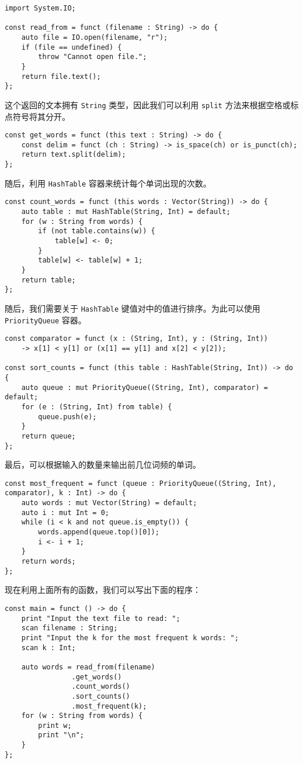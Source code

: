 \begin{lstlisting}
import System.IO;

const read_from = funct (filename : String) -> do {
    auto file = IO.open(filename, "r");
    if (file == undefined) {
        throw "Cannot open file.";
    }
    return file.text();
};
\end{lstlisting}

这个返回的文本拥有 \lstinline!String! 类型，因此我们可以利用 \lstinline!split! 方法来根据空格或标点符号将其分开。

\begin{lstlisting}
const get_words = funct (this text : String) -> do {
    const delim = funct (ch : String) -> is_space(ch) or is_punct(ch);
    return text.split(delim);
};
\end{lstlisting}

随后，利用 \lstinline!HashTable! 容器来统计每个单词出现的次数。

\begin{lstlisting}
const count_words = funct (this words : Vector(String)) -> do {
    auto table : mut HashTable(String, Int) = default;
    for (w : String from words) {
        if (not table.contains(w)) {
            table[w] <- 0;
        }
        table[w] <- table[w] + 1;
    }
    return table;
};
\end{lstlisting}

随后，我们需要关于 \lstinline!HashTable! 键值对中的值进行排序。为此可以使用 \lstinline!PriorityQueue! 容器。

\begin{lstlisting}
const comparator = funct (x : (String, Int), y : (String, Int)) 
    -> x[1] < y[1] or (x[1] == y[1] and x[2] < y[2]);

const sort_counts = funct (this table : HashTable(String, Int)) -> do {
    auto queue : mut PriorityQueue((String, Int), comparator) = default;
    for (e : (String, Int) from table) {
        queue.push(e);
    }
    return queue;
};
\end{lstlisting}

最后，可以根据输入的数量来输出前几位词频的单词。

\begin{lstlisting}
const most_frequent = funct (queue : PriorityQueue((String, Int), comparator), k : Int) -> do {
    auto words : mut Vector(String) = default;
    auto i : mut Int = 0;
    while (i < k and not queue.is_empty()) {
        words.append(queue.top()[0]);
        i <- i + 1;
    }
    return words;
};
\end{lstlisting}

现在利用上面所有的函数，我们可以写出下面的程序：

\begin{lstlisting}
const main = funct () -> do {
    print "Input the text file to read: ";
    scan filename : String;
    print "Input the k for the most frequent k words: ";
    scan k : Int;

    auto words = read_from(filename)
                .get_words()
                .count_words()
                .sort_counts()
                .most_frequent(k);
    for (w : String from words) {
        print w;
        print "\n";
    }
};
\end{lstlisting}